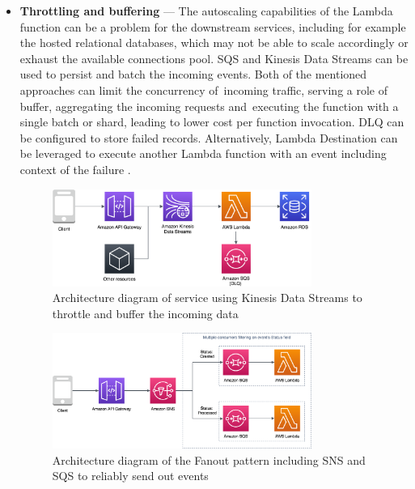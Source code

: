 \begin{itemize}
   \item \textbf{Throttling and buffering} --- The autoscaling capabilities of the Lambda function can be a problem for the downstream services, including for example the hosted relational databases, which may not be able to scale accordingly or exhaust the available connections pool.
   SQS and Kinesis Data Streams can be used to persist and batch the incoming events.
   Both of the mentioned approaches can limit the concurrency of~incoming traffic, serving a role of buffer, aggregating the incoming requests and~executing the function with a single batch or shard, leading to lower cost per function invocation.
   DLQ can be configured to store failed records. Alternatively, Lambda Destination can be leveraged to execute another Lambda function with an event including context of the failure \cite{ServerlessArchitecturalPatternsAndBestPractices}.
  
   \begin{figure}[H]
       \centering
       \includegraphics[width=0.8\textwidth]{assets/04-serverless-for-web-apps/buffer.png}
       \caption{Architecture diagram of service using Kinesis Data Streams to throttle and buffer the incoming data}
       \label{fig:throttling-and-buffering-diagram}
   \end{figure}
   
   \begin{figure}[]
       \centering
       \includegraphics[width=0.8\textwidth]{assets/04-serverless-for-web-apps/fanout.png}
       \caption{Architecture diagram of the Fanout pattern including SNS and SQS to reliably send out events}
       \label{fig:fanout-diagram}
   \end{figure}


\end{itemize}
